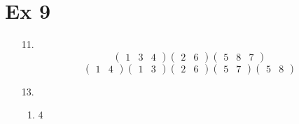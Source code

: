 \documentclass{article}
\begin{document}
\section*{Ex 9}
\begin{itemize}
\item [11.]
  \begin{equation*}
    \begin{pmatrix}
      1 & 3 &  4
    \end{pmatrix}
    \begin{pmatrix}
      2 & 6
    \end{pmatrix}
    \begin{pmatrix}
      5 & 8 & 7
    \end{pmatrix}
  \end{equation*}
  \begin{equation*}
    \begin{pmatrix}
      1 & 4
    \end{pmatrix}
    \begin{pmatrix}
      1 & 3
    \end{pmatrix}
    \begin{pmatrix}
      2 & 6
    \end{pmatrix}
    \begin{pmatrix}
      5 & 7
    \end{pmatrix}
    \begin{pmatrix}
      5 & 8
    \end{pmatrix}
  \end{equation*}
\item [13.]
  \begin{enumerate}[label=\alph*.]
  \item 4
    

\end{enumerate}
\end{itemize}
\end{document}
